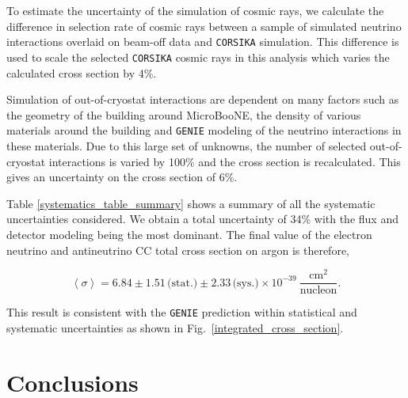 \documentclass[%
 reprint,
 twocolumn,
superscriptaddress,
showpacs,preprintnumbers,
 amsmath,amssymb,
 aps,
prd,
longbibliography
]{revtex4-1}
\begin{document}

To estimate the uncertainty of the simulation of cosmic rays, we calculate the difference in selection rate of cosmic rays between a sample of simulated neutrino interactions overlaid on beam-off data and \texttt{CORSIKA} simulation. This difference is used to scale the selected \texttt{CORSIKA} cosmic rays in this analysis which varies the calculated cross section by 4\%. 

Simulation of out-of-cryostat interactions are dependent on many factors such as the geometry of the building around MicroBooNE, the density of various materials around the building and \texttt{GENIE} modeling of the neutrino interactions in these materials. Due to this large set of unknowns, the number of selected out-of-cryostat interactions is varied by 100\% and the cross section is recalculated. This gives an uncertainty on the cross section of 6\%. 


Table \ref{systematics_table_summary} shows a summary of all the systematic uncertainties considered. We obtain a total uncertainty of 34\% with the flux and detector modeling being the most dominant. The final value of the electron neutrino and antineutrino CC total cross section on argon is therefore,

\begin{equation*}
    \left<\sigma\right> = 6.84 \pm 1.51\, \textrm{(stat.)} \pm 2.33\,\textrm{(sys.)} \times 10^{-39}~\frac{\textrm{cm}^{2}}{\textrm{nucleon}}.
\end{equation*}

This result is consistent with the \texttt{GENIE} prediction within statistical and systematic uncertainties as shown in Fig.~\ref{integrated_cross_section}.





\section{Conclusions}\label{sec:conc}
\end{document}
